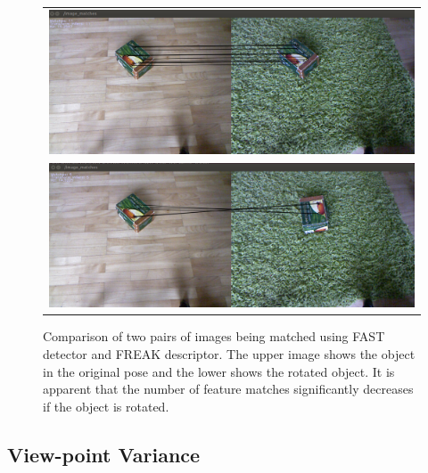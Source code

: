 \begin{figure}
\centering
    \begin{tabular}{c}
 

\includegraphics[width=0.7\columnwidth]{figures/freak-no-rotation.png}\\
\includegraphics[width=0.7\columnwidth]{figures/freak-rotation.png}\\
    \end{tabular}


\caption{Comparison of two pairs of images being matched using FAST detector and FREAK descriptor. The upper image shows the object in the original pose and the lower shows the rotated object. It is apparent that the number of feature matches significantly decreases if the object is rotated. }
\label{fig:freak-features}
\end{figure}

 





\subsection{View-point Variance}

